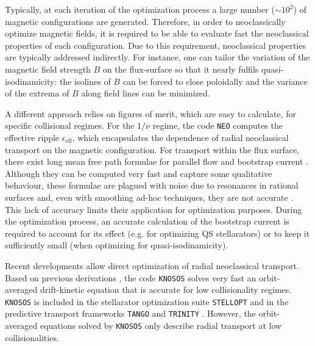 Typically, at each iteration of the optimization process a large number ($\sim$$10^2$) of magnetic configurations are generated. Therefore, in order to neoclassically optimize magnetic fields, it is required to be able to evaluate fast the neoclassical properties of each configuration. Due to this requirement, neoclassical properties are typically addressed indirectly. For instance, one can tailor the variation of the magnetic field strength $B$ on the flux-surface so that it nearly fulfils quasi-isodinamicity: the isolines of $B$ can be forced to close poloidally and the variance of the extrema of $B$ along field lines can be minimized.
%

A different approach relies on figures of merit, which are easy to calculate, for specific collisional regimes. For the $1/\nu$ regime, the code {\texttt{NEO}} \cite{Nemov1999EvaluationO1} computes the effective ripple $\epsilon_{\text{eff}}$, which encapsulates the dependence of radial neoclassical transport on the magnetic configuration. For transport within the flux surface, there exist long mean free path formulae for parallel flow and bootstrap current \cite{Shaing-Callen-1983,Nakajima-1988,helander_parra_newton_2017}. Although they can be computed very fast and capture some qualitative behaviour, these formulae are plagued with noise due to resonances in rational surfaces and, even with smoothing ad-hoc techniques, they are not accurate \cite{Landreman_SelfConsistent}. This lack of accuracy limits their application for optimization purposes. During the optimization process, an accurate calculation of the bootstrap current is required to account for its effect (e.g. for optimizing QS stellarators) or to keep it sufficiently small (when optimizing for quasi-isodinamicity). 

Recent developments allow direct optimization of radial neoclassical transport. Based on previous derivations \cite{Calvo_2017,dherbemont2022}, the code {\texttt{KNOSOS}} \cite{KNOSOSJCP,KNOSOSJPP} solves very fast an orbit-averaged drift-kinetic equation that is accurate for low collisionality regimes. {\texttt{KNOSOS}} is included in the stellarator optimization suite \texttt{STELLOPT} \cite{STELLOPT} and in the predictive transport frameworks {\texttt{TANGO}} \cite{Banon_Navarro_2023} and \texttt{TRINITY} \cite{Barnes_Trinity_2010}. However, the orbit-averaged equations solved by {\texttt{KNOSOS}} only describe radial transport at low collisionalities. 

